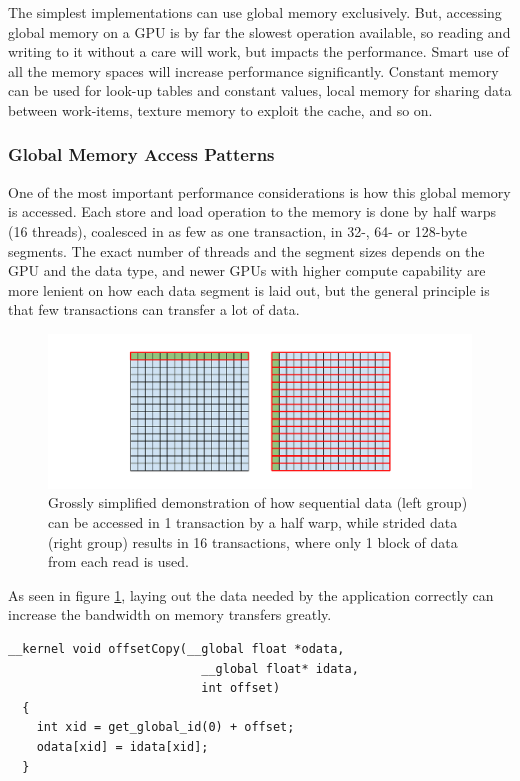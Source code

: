 The simplest implementations can use global memory exclusively. But,
accessing global memory on a GPU is by far the slowest operation
available, so reading and writing to it without a care will work, but
impacts the performance. Smart use of all the memory spaces will
increase performance significantly. Constant memory can be used for
look-up tables and constant values, local memory for sharing data
between work-items, texture memory to exploit the cache, and so on. 

\subsubsection{Global Memory Access Patterns}
\label{sect:global-memory-optimization}
One of the most important performance considerations is how this
global memory is accessed. Each store and load operation to the memory
is done by half warps (16 threads), coalesced in as few as one
transaction, in 32-, 64- or 128-byte segments. The exact number of
threads and the segment sizes depends on the GPU and the data type,
and newer GPUs with higher compute capability are more lenient on how
each data segment is laid out, but the general principle is that few
transactions can transfer a lot of data.


\begin{figure}[h]
  \includegraphics[width=\textwidth]{images/coalesced-access.pdf}
  \caption{Grossly simplified demonstration of how sequential data
    (left group) can be accessed in 1 transaction by a half warp,
    while strided data (right group) results in 16 transactions, where
    only 1 block of data from each read is used.}
  \label{fig:execution-model-figure}
\end{figure}

As seen in figure \ref{fig:execution-model-figure}, laying out the
data needed by the application correctly can increase the bandwidth on
memory transfers greatly.

\begin{lstlisting}[label={lst:coalesced_test}, caption=Copy kernel
  with offset argument]
  __kernel void offsetCopy(__global float *odata,
                           __global float* idata,
                           int offset)
  {
    int xid = get_global_id(0) + offset;
    odata[xid] = idata[xid];
  }
\end{lstlisting}

